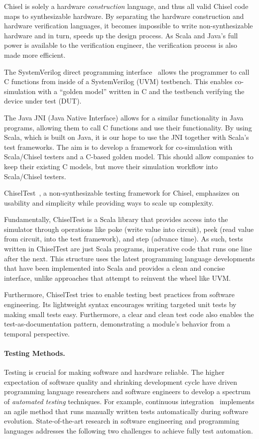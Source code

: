 \documentclass[fleqn,12pt]{article}
\begin{document}
Chisel is solely a hardware \emph{construction} language, and thus all valid Chisel code
maps to synthesizable hardware.
By separating the hardware construction and hardware verification languages,
it becomes impossible to write non-synthesizable hardware and in turn, speeds up the design process.
As Scala and Java's full power is available to the verification engineer,
the verification process is also made more efficient.

The SystemVerilog direct programming interface~\cite{Doulos:SV:dpi} allows the programmer to call
C functions from inside of a SystemVerilog (UVM) testbench.
This enables co-simulation with a ``golden model'' written in C and the
testbench verifying the device under test (DUT).

The Java JNI (Java Native Interface) allows for a similar functionality in Java programs,
allowing them to call C functions and use their functionality.
By using Scala, which is built on Java, it is our hope to use the JNI together with Scala's test frameworks.
The aim is to develop a framework for co-simulation with Scala/Chisel testers and a
C-based golden model. This should allow companies to keep their existing C models,
but move their simulation workflow into Scala/Chisel testers.

ChiselTest~\cite{chisel:tester2}, a non-synthesizable testing framework for Chisel,
emphasizes on usability and simplicity while providing ways to scale up complexity.

Fundamentally, ChiselTest is a Scala library that provides access into the simulator through
operations like poke (write value into circuit), peek (read value from circuit, into the test framework), and step (advance time).
As such, tests written in ChiselTest are just Scala programs, imperative code that runs one line after the next.
This structure uses the latest programming language developments that have been implemented into Scala and provides a clean and concise interface, unlike approaches that attempt to reinvent the wheel like UVM.

Furthermore, ChiselTest tries to enable testing best practices from software engineering.
Its lightweight syntax encourages writing targeted unit tests by making small tests easy.
Furthermore, a clear and clean test code also enables the test-as-documentation pattern,
demonstrating a module's behavior from a temporal perspective.


\paragraph{Testing Methods.}
Testing is crucial for making software and hardware reliable. The higher
expectation of software quality and shrinking development cycle have
driven programming language researchers and software engineers to
develop a spectrum of \emph{automated testing} techniques. For
example, continuous integration~\cite{duvall2007continuous} implements
an agile method that runs manually written tests automatically during
software evolution.  State-of-the-art research in software engineering
and programming languages addresses the following two challenges to
achieve fully test automation.
\end{document}
